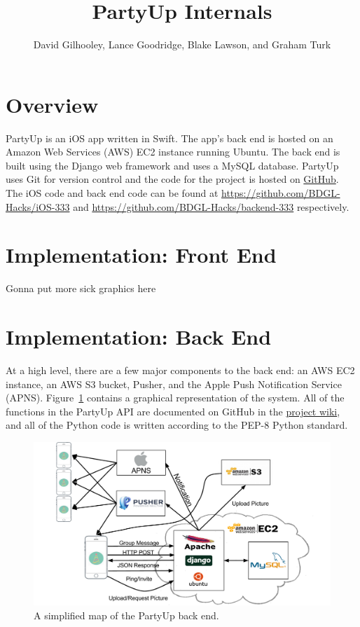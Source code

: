 \documentclass[12pt]{article}
\title{PartyUp Internals}
\author{David Gilhooley, Lance Goodridge, Blake Lawson, and Graham Turk}
\begin{document}
\pagestyle{plain}

\maketitle

\section{Overview}

PartyUp is an iOS app written in Swift.
The app's back end is hosted on an Amazon Web Services (AWS)
EC2 instance running Ubuntu.
The back end is built using the Django web framework and uses
a MySQL database.
PartyUp uses Git for version control and the code for the project is 
hosted on \href{https://github.com/}{GitHub}.
The iOS code and back end code can be found at 
\url{https://github.com/BDGL-Hacks/iOS-333} and
\url{https://github.com/BDGL-Hacks/backend-333} respectively.


\section{Implementation: Front End}

Gonna put more sick graphics here

\section{Implementation: Back End}

At a high level, there are a few major components to the back end:
an AWS EC2 instance, an AWS S3 bucket, Pusher, and the Apple Push Notification Service (APNS).
Figure~\ref{fig:stack} contains a graphical representation of the system.
All of the functions in the PartyUp API are documented on GitHub
in the \href{https://github.com/BDGL-Hacks/backend-333/wiki}{project wiki},
and all of the Python code is written according to the PEP-8 Python standard.

\begin{figure}[h]
    \centering
    \includegraphics[scale=0.4]{Stack.png}
    \caption{
        A simplified map of the PartyUp back end. 
    }
    \label{fig:stack}
\end{figure}
\end{document}
